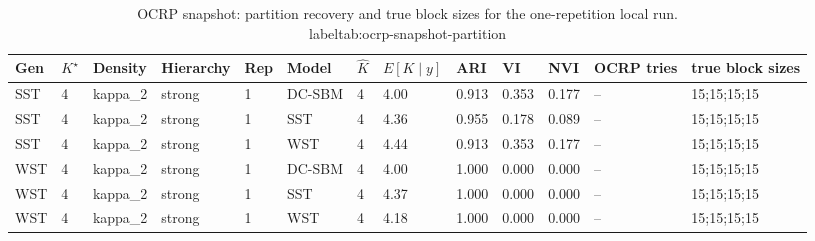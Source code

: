 \begin{table}[!h]
\centering
\caption{OCRP snapshot: partition recovery and true block sizes for the one-repetition local run.\\label{tab:ocrp-snapshot-partition}}
\centering
\begin{tabular}[t]{lllllllllllll}
\toprule
Gen & $K^\star$ & Density & Hierarchy & Rep & Model & $\hat K$ & $E[K\mid y]$ & ARI & VI & NVI & OCRP tries & true block sizes\\
\midrule
SST & 4 & kappa_2 & strong & 1 & DC-SBM & 4 & 4.00 & 0.913 & 0.353 & 0.177 & -- & 15;15;15;15\\
SST & 4 & kappa_2 & strong & 1 & SST & 4 & 4.36 & 0.955 & 0.178 & 0.089 & -- & 15;15;15;15\\
SST & 4 & kappa_2 & strong & 1 & WST & 4 & 4.44 & 0.913 & 0.353 & 0.177 & -- & 15;15;15;15\\
WST & 4 & kappa_2 & strong & 1 & DC-SBM & 4 & 4.00 & 1.000 & 0.000 & 0.000 & -- & 15;15;15;15\\
WST & 4 & kappa_2 & strong & 1 & SST & 4 & 4.37 & 1.000 & 0.000 & 0.000 & -- & 15;15;15;15\\
WST & 4 & kappa_2 & strong & 1 & WST & 4 & 4.18 & 1.000 & 0.000 & 0.000 & -- & 15;15;15;15\\
\bottomrule
\end{tabular}
\end{table}
